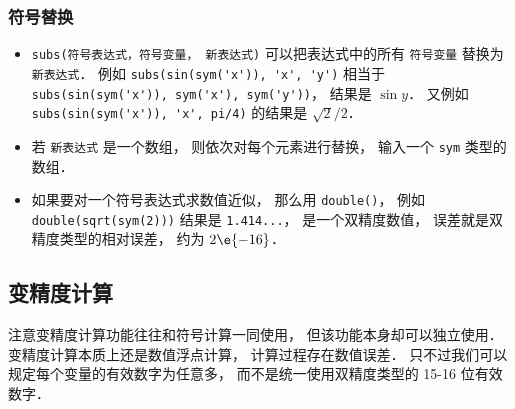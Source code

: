\subsubsection{符号替换}
\begin{itemize}
\item \verb|subs(符号表达式，符号变量， 新表达式)| 可以把表达式中的所有 \verb|符号变量| 替换为 \verb|新表达式|． 例如 \verb|subs(sin(sym('x')), 'x', 'y')| 相当于 \verb|subs(sin(sym('x')), sym('x'), sym('y'))|， 结果是 $\sin y$． 又例如 \verb|subs(sin(sym('x')), 'x', pi/4)| 的结果是 $\sqrt 2/2$．
\item 若 \verb|新表达式| 是一个数组， 则依次对每个元素进行替换， 输入一个 \verb|sym| 类型的数组．
\item 如果要对一个符号表达式求数值近似， 那么用 \verb|double()|， 例如 \verb|double(sqrt(sym(2)))| 结果是 \verb|1.414...|， 是一个双精度数值， 误差就是双精度类型的相对误差， 约为 $2\e{-16}$．
\end{itemize}

\subsection{变精度计算}
注意变精度计算功能往往和符号计算一同使用， 但该功能本身却可以独立使用． 变精度计算本质上还是数值浮点计算， 计算过程存在数值误差． 只不过我们可以规定每个变量的有效数字为任意多， 而不是统一使用双精度类型的 15-16 位有效数字．

